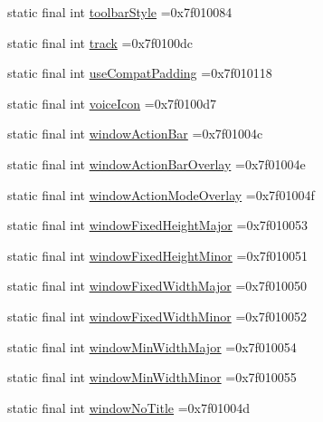 \begin{DoxyCompactItemize}
\item 
static final int \hyperlink{classproject4_1_1xaria_1_1R_1_1attr_a101d78018ae9b2eb12267e4c42a34b4a}{toolbar\+Style} =0x7f010084
\item 
static final int \hyperlink{classproject4_1_1xaria_1_1R_1_1attr_afe97322c806849b91f5fe685aa4859aa}{track} =0x7f0100dc
\item 
static final int \hyperlink{classproject4_1_1xaria_1_1R_1_1attr_a47e880a26bb5b510f329d0e535991a58}{use\+Compat\+Padding} =0x7f010118
\item 
static final int \hyperlink{classproject4_1_1xaria_1_1R_1_1attr_aa73c92d7b18abbfa22a5eef18858ce77}{voice\+Icon} =0x7f0100d7
\item 
static final int \hyperlink{classproject4_1_1xaria_1_1R_1_1attr_a68f9fac255af3cd5b18a31ccfe66ca09}{window\+Action\+Bar} =0x7f01004c
\item 
static final int \hyperlink{classproject4_1_1xaria_1_1R_1_1attr_a15d3726d1218007a750534b444346cfa}{window\+Action\+Bar\+Overlay} =0x7f01004e
\item 
static final int \hyperlink{classproject4_1_1xaria_1_1R_1_1attr_a60013c3426d8e626e5a8d80f7ec529b4}{window\+Action\+Mode\+Overlay} =0x7f01004f
\item 
static final int \hyperlink{classproject4_1_1xaria_1_1R_1_1attr_a94fc7fa359ad89e25f08eed9b0de79e1}{window\+Fixed\+Height\+Major} =0x7f010053
\item 
static final int \hyperlink{classproject4_1_1xaria_1_1R_1_1attr_a0e1fcaf24690792c76ae309ee7216fef}{window\+Fixed\+Height\+Minor} =0x7f010051
\item 
static final int \hyperlink{classproject4_1_1xaria_1_1R_1_1attr_ae5831b0a31d4458b723871022f7e8d58}{window\+Fixed\+Width\+Major} =0x7f010050
\item 
static final int \hyperlink{classproject4_1_1xaria_1_1R_1_1attr_a30da977f5432ea01fe0dea2704d8c7cb}{window\+Fixed\+Width\+Minor} =0x7f010052
\item 
static final int \hyperlink{classproject4_1_1xaria_1_1R_1_1attr_aed5952961d833452c641606816e51df1}{window\+Min\+Width\+Major} =0x7f010054
\item 
static final int \hyperlink{classproject4_1_1xaria_1_1R_1_1attr_ae0595a8e89c06d3d94aa4a6edadde30b}{window\+Min\+Width\+Minor} =0x7f010055
\item 
static final int \hyperlink{classproject4_1_1xaria_1_1R_1_1attr_af115a2b2aa1836f49d8fe3af8acfac1a}{window\+No\+Title} =0x7f01004d
\end{DoxyCompactItemize}


